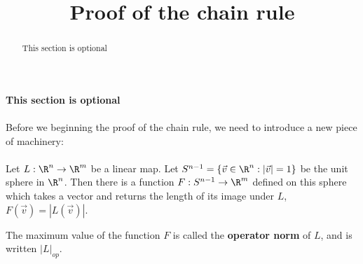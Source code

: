 \documentclass{ximera}
\title{Proof of the chain rule}
\begin{document}
	\begin{abstract}
		This section is optional
	\end{abstract}
	
	\textbf{This section is optional}
	\\
	\\
	Before we beginning the proof of the chain rule, we need to introduce a new piece of machinery:
	\\
	\\
	Let $L:\R^n \to \R^m$ be a linear map.  Let $S^{n-1} = \{ \vec{v} \in \R^n: |\vec{v}|  = 1\}$ be the unit sphere in $\R^n$.  Then there is a function
		$F: S^{n-1} \to \R^m$ defined on this sphere which takes a vector and returns the length of its image under $L$, $F(\vec{v}) = |L(\vec{v})|$.  
		
	\begin{definition}
		The maximum value of the function $F$ is called the \textbf{operator norm} of $L$, and is written $|L|_{op}$.
	\end{definition}
	
\end{document}
